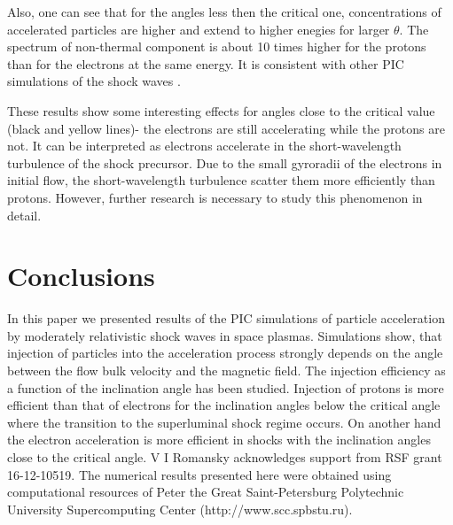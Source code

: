 \documentclass[a4paper]{jpconf}
\begin{document}
Also, one can see that for the angles less then the critical one, concentrations of accelerated particles are higher and extend to higher enegies for larger $\theta$. The spectrum of non-thermal component is about 10 times higher for the protons than for the electrons at the same energy. It is consistent with other PIC simulations of the shock waves {\cite{Sironi2011}}.

These results show some interesting effects for angles close to the critical value (black and yellow lines)- the electrons are still accelerating while the protons are not. It can be interpreted as electrons accelerate in the short-wavelength turbulence of the shock precursor. Due to the small gyroradii of the electrons in initial flow, the short-wavelength turbulence scatter them more efficiently than protons. However, further research is necessary to study this phenomenon in detail.


\section{Conclusions}
In this paper we presented results of the PIC simulations of particle acceleration by moderately relativistic shock waves in space plasmas. Simulations show, that injection of particles into the acceleration process strongly depends on the angle between the flow bulk velocity and the magnetic field. The injection efficiency as a function of the inclination angle has been studied. Injection of protons is more efficient than that of electrons for the inclination angles below the critical angle where the transition to the superluminal shock regime occurs. On  another hand the electron acceleration is more efficient in shocks with the inclination angles close to the critical angle.
\ack
V I Romansky acknowledges support from RSF grant 16-12-10519.
The numerical results presented here were obtained using computational resources of Peter the Great Saint-Petersburg Polytechnic University Supercomputing Center (http://www.scc.spbstu.ru). 
\end{document}
